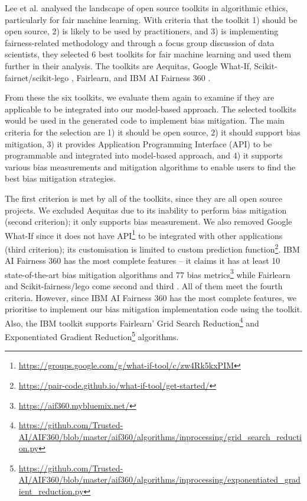 \documentclass[sigconf,review]{acmart}
\begin{document}
Lee et al. \cite{lee2021landscape} analysed the landscape of open source toolkits in algorithmic ethics, particularly for fair machine learning. With criteria that the toolkit 1) should be open source, 2) is likely to be used by practitioners, and 3) is implementing fairness-related methodology and through a focus group discussion of data scientists, they selected 6 best toolkits for fair machine learning and used them further in their analysis. The toolkits are Aequitas\cite{saleiro2019aequitas}, Google What-If\cite{googlewhatif2020}, Scikit-fairnet/scikit-lego \cite{scikitfairness2022,scikitlego2022}, Fairlearn\cite{bird2020fairlearn}, and IBM AI Fairness 360 \cite{bellamy2018ai}.  

From these the six toolkits, we evaluate them again to examine if they are applicable to be integrated into our model-based approach. The selected toolkits would be used in the generated code to implement bias mitigation. The main criteria for the selection are 1) it should be open source, 2) it should support bias mitigation, 3) it provides Application Programming Interface (API) to be programmable and integrated into model-based approach, and 4) it supports various bias measurements and mitigation algorithms to enable users to find the best bias mitigation strategies. 

The first criterion is met by all of the toolkits, since they are all open source projects. We excluded Aequitas due to its inability to perform bias mitigation (second criterion); it only supports bias measurement. We also removed Google What-If since it does not have API\footnote{\url{https://groups.google.com/g/what-if-tool/c/zw4Rk5kxPIM}} to be integrated with other applications (third criterion); its customisation is limited to custom prediction function\footnote{\url{https://pair-code.github.io/what-if-tool/get-started/}}. IBM AI Fairness 360 has the most complete features -- it claims it has at least 10 state-of-the-art bias mitigation algorithms and 77 bias metrics\footnote{\url{https://aif360.mybluemix.net/}} while Fairlearn and Scikit-fairness/lego come second and third \cite{lee2021landscape}. All of them meet the fourth criteria. However, since IBM AI Fairness 360 has the most complete features, we prioritise to implement our bias mitigation implementation code using the toolkit. Also, the IBM toolkit supports Fairlearn' Grid Search Reduction\footnote{\url{https://github.com/Trusted-AI/AIF360/blob/master/aif360/algorithms/inprocessing/grid\_search\_reduction.py}} and Exponentiated Gradient Reduction\footnote{\url{https://github.com/Trusted-AI/AIF360/blob/master/aif360/algorithms/inprocessing/exponentiated\_gradient\_reduction.py}} algorithms.
\end{document}
